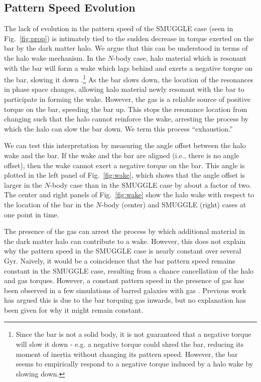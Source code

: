 \documentclass[fleqn,usenatbib]{mnras}
\newcommand{\Nbody}{$N$-body}
\begin{document}
\subsection{Pattern Speed Evolution}
The lack of evolution in the pattern speed of the SMUGGLE case (seen in
Fig.~\ref{fig:prop}) is intimately tied to the sudden decrease in torque exerted
on the bar by the dark matter halo. We argue that this can be understood in
terms of the halo wake mechanism. In the \Nbody{} case, halo material which is
resonant with the bar will form a wake which lags behind and exerts a negative
torque on the bar, slowing it down \citep{1984MNRAS.209..729T,
1985MNRAS.213..451W, 1992ApJ...400...80H}.\footnote{Since the bar is not a solid
body, it is not guaranteed that a negative torque will slow it down - e.g. a
negative torque could shred the bar, reducing its moment of inertia without
changing its pattern speed. However, the bar seems to empirically respond to a
negative torque induced by a halo wake by slowing down.} As the bar slows down,
the location of the resonances in phase space changes, allowing halo material
newly resonant with the bar to participate in forming the wake. However, the gas
is a reliable source of positive torque on the bar, speeding the bar up. This
stops the resonance location from changing such that the halo cannot reinforce
the wake, arresting the process by which the halo can slow the bar down. We term
this process ``exhaustion.''

We can test this interpretation by measuring the angle offset between the halo
wake and the bar. If the wake and the bar are aligned (i.e., there is no angle
offset), then the wake cannot exert a negative torque on the bar. This angle
is plotted in the left panel of Fig.~\ref{fig:wake}, which shows that the
angle offset is larger in the \Nbody{} case than in the SMUGGLE case by about a
factor of two. The center and right panels of Fig.~\ref{fig:wake} show the halo
wake with respect to the location of the bar in the \Nbody{} (center) and SMUGGLE
(right) cases at one point in time.

The presence of the gas can arrest the process by which additional material in
the dark matter halo can contribute to a wake. However, this does not explain
why the pattern speed in the SMUGGLE case is nearly constant over several Gyr.
Naively, it would be a coincidence that the bar pattern speed remains constant
in the SMUGGLE case, resulting from a chance cancellation of the halo and gas
torques. However, a constant pattern speed in the presence of gas has been
observed in a few simulations of barred galaxies with
gas \citep{1993AA...268...65F, 2010ApJ...719.1470V, 2014MNRAS.438L..81A}. Previous
work has argued this is due to the bar torquing gas inwards, but no explanation
has been given for why it might remain constant.
\end{document}
